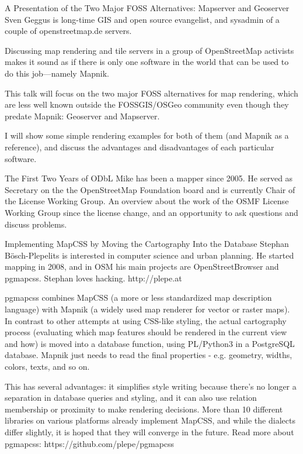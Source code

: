 %
{A Presentation of the Two Major FOSS Alternatives: Mapserver and Geoserver}%
{Sven Geggus is long-time GIS and open source evangelist, and sysadmin of a couple of openstreetmap.de servers.}%
{Discussing map rendering and tile servers in a group of OpenStreetMap activists makes it sound as if there is only one software in the world that can be used to do this job---namely Mapnik.

This talk will focus on the two major FOSS alternatives for map rendering, which are less well
known outside the FOSSGIS/OSGeo community even though they predate Mapnik: Geoserver and Mapserver.

I will show some simple rendering examples for both of them (and Mapnik as a reference), and discuss the advantages and disadvantages of each particular software.}

%
{The First Two Years of ODbL}%
{Mike has been a mapper since 2005. He served as Secretary on the the OpenStreetMap Foundation board and is currently Chair of the License Working Group. }%
{An overview about the work of the OSMF License Working Group since the license change, and an opportunity to ask questions and discuss problems. }

%
{Implementing MapCSS by Moving the Cartography Into the Database}%
{Stephan Bösch-Plepelits is interested in computer science and urban planning. He started mapping in 2008, and in OSM his main projects are OpenStreetBrowser and pgmapcss. Stephan loves hacking. http://plepe.at }%
{pgmapcss combines MapCSS (a more or less standardized map description language) with Mapnik (a widely used map renderer for vector or raster maps). In contrast to other attempts at using CSS-like styling, the actual cartography process (evaluating which map features should be rendered  in the current view and how) is moved into a database function, using PL/Python3 in a PostgreSQL database. Mapnik just needs to read the final properties - e.g. geometry, widths, colors, texts, and so on.

This has several advantages: it simplifies style writing because there's no longer a separation in database queries and styling, and it can also use relation membership or proximity to make rendering decisions. More than 10 different libraries on various platforms already implement MapCSS, and while the dialects differ slightly, it is hoped that they will converge in the future. Read more about pgmapcss: https://github.com/plepe/pgmapcss}

